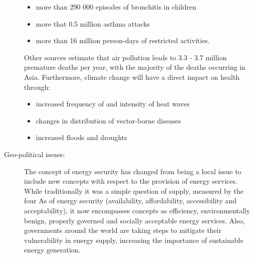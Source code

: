 \begin{description}
\begin{itemize}
			\item more than 290 000 episodes of bronchitis in children
			\item more that 0.5 million asthma attacks
			\item more than 16 million person-days of restricted activities.
		\end{itemize} 
		Other sources estimate that air pollution leads to 3.3 - 3.7 million premature deaths per year, with the majority of the deaths occurring in Asia.
		Furthermore, climate change will have a direct impact on health through:
		\begin{itemize}
			\item increased frequency of and intensity of heat waves
			\item changes in distribution of vector-borne diseases
			\item increased floods and droughts
		\end{itemize}
	\item[Geo-political issues:] The concept of energy security has changed from being a local issue to include new concepts with respect to the provision of energy services. While traditionally it was a simple question of supply, measured by the four As of energy security (availability, affordability, accessibility and acceptability), it now encompasses concepts as efficiency, environmentally benign, properly governed and socially acceptable energy services. Also, governments around the world are taking steps to mitigate their vulnerability in energy supply, increasing the importance of sustainable energy generation. 
\end{description}


